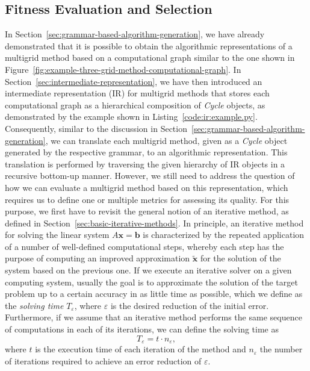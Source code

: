 \subsection{Fitness Evaluation and Selection}
\label{sec:fitness-evaluation-and-selection}
In Section~\ref{sec:grammar-based-algorithm-generation},
we have already demonstrated that it is possible to obtain the algorithmic representations of a multigrid method based on a computational graph similar to the one shown in Figure~\ref{fig:example-three-grid-method-computational-graph}.
In Section~\ref{sec:intermediate-representation}, we have then introduced an intermediate representation (IR) for multigrid methods that stores each computational graph as a hierarchical composition of \emph{Cycle} objects, as demonstrated by the example shown in Listing~\ref{code:ir:example.py}.
Consequently, similar to the discussion in Section~\ref{sec:grammar-based-algorithm-generation}, we can translate each multigrid method, given as a \emph{Cycle} object generated by the respective grammar, to an algorithmic representation.
This translation is performed by traversing the given hierarchy of IR objects in a recursive bottom-up manner.
However, we still need to address the question of how we can evaluate a multigrid method based on this representation, which requires us to define one or multiple metrics for assessing its quality.
For this purpose, we first have to revisit the general notion of an iterative method, as defined in Section~\ref{sec:basic-iterative-methods}.
In principle, an iterative method for solving the linear system $A \bm{x} = \bm{b}$ is characterized by the repeated application of a number of well-defined computational steps, whereby each step has the purpose of computing an improved approximation $\tilde{\bm{x}}$ for the solution of the system based on the previous one.
If we execute an iterative solver on a given computing system, usually the goal is to approximate the solution of the target problem up to a certain accuracy in as little time as possible, which we define as the \emph{solving time} $T_{\varepsilon}$, where $\varepsilon$ is the desired reduction of the initial error. 
Furthermore, if we assume that an iterative method performs the same sequence of computations in each of its iterations, we can define the solving time as
\begin{equation}
	T_{\varepsilon} = t \cdot n_{\varepsilon},
	\label{eq:solving-time-basic}
\end{equation} 
where $t$ is the execution time of each iteration of the method and $n_{\varepsilon}$ the number of iterations required to achieve an error reduction of $\varepsilon$.
